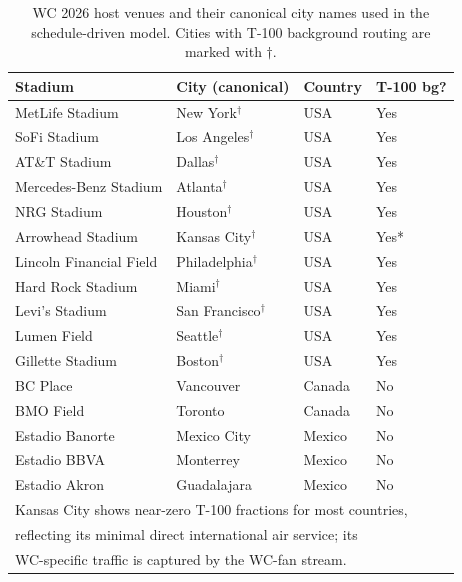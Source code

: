 \documentclass[12pt]{article}
\begin{document}
\begin{table}[h!]
\centering
\caption{WC 2026 host venues and their canonical city names used in the
  schedule-driven model. Cities with T-100 background routing are
  marked with $\dagger$.}
\label{tab:venues}
\begin{tabular}{llll}
\toprule
\textbf{Stadium} & \textbf{City (canonical)} & \textbf{Country} &
\textbf{T-100 bg?} \\
\midrule
MetLife Stadium        & New York$^\dagger$     & USA    & Yes \\
SoFi Stadium           & Los Angeles$^\dagger$  & USA    & Yes \\
AT\&T Stadium          & Dallas$^\dagger$       & USA    & Yes \\
Mercedes-Benz Stadium  & Atlanta$^\dagger$      & USA    & Yes \\
NRG Stadium            & Houston$^\dagger$      & USA    & Yes \\
Arrowhead Stadium      & Kansas City$^\dagger$  & USA    & Yes* \\
Lincoln Financial Field& Philadelphia$^\dagger$ & USA    & Yes \\
Hard Rock Stadium      & Miami$^\dagger$        & USA    & Yes \\
Levi's Stadium         & San Francisco$^\dagger$& USA    & Yes \\
Lumen Field            & Seattle$^\dagger$      & USA    & Yes \\
Gillette Stadium       & Boston$^\dagger$       & USA    & Yes \\
BC Place               & Vancouver              & Canada & No  \\
BMO Field              & Toronto                & Canada & No  \\
Estadio Banorte        & Mexico City            & Mexico & No  \\
Estadio BBVA           & Monterrey              & Mexico & No  \\
Estadio Akron          & Guadalajara            & Mexico & No  \\
\bottomrule
\multicolumn{4}{l}{\footnotesize * Kansas City shows near-zero T-100 fractions for most countries,} \\
\multicolumn{4}{l}{\footnotesize reflecting its minimal direct international air service; its} \\
\multicolumn{4}{l}{\footnotesize WC-specific traffic is captured by the WC-fan stream.} \\
\end{tabular}
\end{table}
\end{document}

